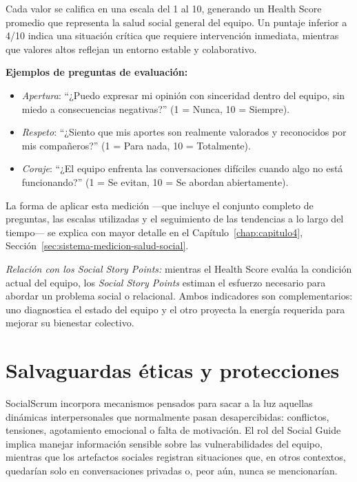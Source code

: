 Cada valor se califica en una escala del 1 al 10, generando un Health Score promedio que representa la salud social general del equipo.
Un puntaje inferior a 4/10 indica una situación crítica que requiere intervención inmediata, mientras que valores altos reflejan un entorno estable y colaborativo.

\vspace{1em}

\textbf{Ejemplos de preguntas de evaluación:}
\begin{itemize}
    \item \textit{Apertura}: ``¿Puedo expresar mi opinión con sinceridad dentro del equipo, sin miedo a consecuencias negativas?'' (1 = Nunca, 10 = Siempre).
    \item \textit{Respeto}: ``¿Siento que mis aportes son realmente valorados y reconocidos por mis compañeros?'' (1 = Para nada, 10 = Totalmente).
    \item \textit{Coraje}: ``¿El equipo enfrenta las conversaciones difíciles cuando algo no está funcionando?'' (1 = Se evitan, 10 = Se abordan abiertamente).
\end{itemize}

La forma de aplicar esta medición —que incluye el conjunto completo de preguntas, las escalas utilizadas y el seguimiento de las tendencias a lo largo del tiempo— se explica con mayor detalle en el Capítulo~\ref{chap:capitulo4}, Sección~\ref{sec:sistema-medicion-salud-social}.

\emph{Relación con los Social Story Points:} mientras el Health Score evalúa la condición actual del equipo, los \textit{Social Story Points} estiman el esfuerzo necesario para abordar un problema social o relacional. Ambos indicadores son complementarios: uno diagnostica el estado del equipo y el otro proyecta la energía requerida para mejorar su bienestar colectivo.

\section{Salvaguardas éticas y protecciones}
\label{sec:salvaguardas_eticas}

SocialScrum incorpora mecanismos pensados para sacar a la luz aquellas dinámicas interpersonales que normalmente pasan desapercibidas: conflictos, tensiones, agotamiento emocional o falta de motivación. El rol del Social Guide implica manejar información sensible sobre las vulnerabilidades del equipo, mientras que los artefactos sociales registran situaciones que, en otros contextos, quedarían solo en conversaciones privadas o, peor aún, nunca se mencionarían.

